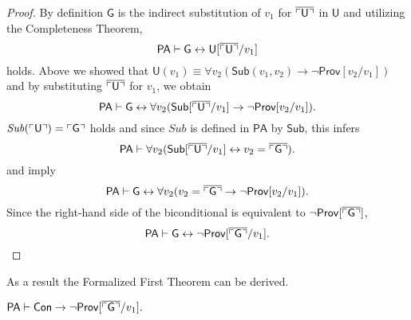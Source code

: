 \begin{proof}
By definition $\mathsf{G}$ is the indirect substitution of $v_1$ for $\overline{\ulcorner \mathsf{U} \urcorner}$ in $\mathsf{U}$ and utilizing the Completeness Theorem,
\begin{equation}
\mathsf{PA \vdash G \leftrightarrow U[\overline{\ulcorner U \urcorner}}/v_1]
\end{equation}
holds. Above we showed that $\mathsf{U}(v_1) \equiv \forall v_2 (\mathsf{Sub}(v_1,v_2) \rightarrow \lnot \mathsf{Prov}[v_2/v_1])$ and by substituting $\overline{\ulcorner \mathsf{U}\urcorner}$ for $v_1$, we obtain
\begin{equation}\label{eq:Gprove1}
\mathsf{PA} \vdash \mathsf{G} \leftrightarrow\forall v_2 (\mathsf{Sub}[\mathsf{\overline{\ulcorner U \urcorner}}/v_1] \rightarrow \lnot \mathsf{Prov}[v_2/v_1]).
\end{equation}
$\mathit{Sub}(\ulcorner\mathsf{U} \urcorner)  = \ulcorner \mathsf{G} \urcorner$ holds and since $\mathit{Sub}$ is defined in $\mathsf{PA}$ by $\mathsf{Sub}$, this infers
\begin{equation}\label{eq:Gprove2}
\mathsf{PA} \vdash \forall v_2  (\mathsf{Sub}[\overline{\ulcorner\mathsf{ U} \urcorner}/ v_1 ] \leftrightarrow v_2 = \overline{\ulcorner\mathsf{ G} \urcorner}).
\end{equation}
 and  imply
\begin{equation}
\mathsf{PA \vdash G }\leftrightarrow \forall v_2  ( v_2 = \overline{\ulcorner \mathsf{G} \urcorner} \rightarrow \lnot \mathsf{Prov}[v_2/v_1]).
\end{equation}
Since the right-hand side of the biconditional is equivalent to $\lnot \mathsf{Prov[\overline{\ulcorner G\urcorner}]}$,
\begin{equation}
\mathsf{PA \vdash G \leftrightarrow \lnot Prov[\overline{\ulcorner G\urcorner}}/v_1].
\end{equation}
\end{proof}
As a result the Formalized First Theorem can be derived.
\begin{thm}
$\mathsf{PA} \vdash \mathsf{Con} \rightarrow \lnot \mathsf{Prov} [\overline{\ulcorner \mathsf{G} \urcorner}/v_1].$
\end{thm}
